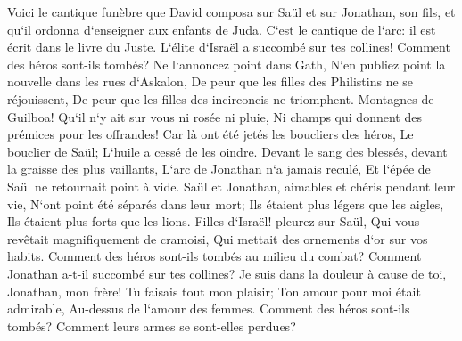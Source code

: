 \verse Voici le cantique funèbre que David composa sur Saül et sur Jonathan, son fils, 
\verse et qu`il ordonna d`enseigner aux enfants de Juda. C`est le cantique de l`arc: il est écrit dans le livre du Juste. 
\verse L`élite d`Israël a succombé sur tes collines! Comment des héros sont-ils tombés? 
\verse Ne l`annoncez point dans Gath, N`en publiez point la nouvelle dans les rues d`Askalon, De peur que les filles des Philistins ne se réjouissent, De peur que les filles des incirconcis ne triomphent. 
\verse Montagnes de Guilboa! Qu`il n`y ait sur vous ni rosée ni pluie, Ni champs qui donnent des prémices pour les offrandes! Car là ont été jetés les boucliers des héros, Le bouclier de Saül; L`huile a cessé de les oindre. 
\verse Devant le sang des blessés, devant la graisse des plus vaillants, L`arc de Jonathan n`a jamais reculé, Et l`épée de Saül ne retournait point à vide. 
\verse Saül et Jonathan, aimables et chéris pendant leur vie, N`ont point été séparés dans leur mort; Ils étaient plus légers que les aigles, Ils étaient plus forts que les lions. 
\verse Filles d`Israël! pleurez sur Saül, Qui vous revêtait magnifiquement de cramoisi, Qui mettait des ornements d`or sur vos habits. 
\verse Comment des héros sont-ils tombés au milieu du combat? Comment Jonathan a-t-il succombé sur tes collines? 
\verse Je suis dans la douleur à cause de toi, Jonathan, mon frère! Tu faisais tout mon plaisir; Ton amour pour moi était admirable, Au-dessus de l`amour des femmes. 
\verse Comment des héros sont-ils tombés? Comment leurs armes se sont-elles perdues? 

\chapter{}

